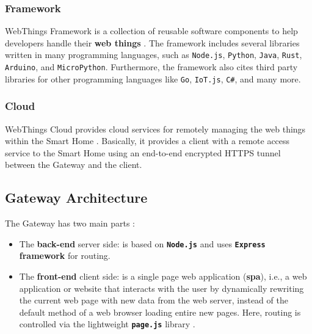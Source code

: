 \subsubsection{Framework}
WebThings Framework is a collection of reusable software components to help developers handle their \textbf{\glspl{web thing}} \cite{wtframework}. The framework includes several libraries written in many programming languages, such as \texttt{Node.js}, \texttt{Python}, \texttt{Java}, \texttt{Rust}, \texttt{Arduino}, and \texttt{MicroPython}. Furthermore, the framework also cites third party libraries for other programming languages like \texttt{Go}, \texttt{IoT.js}, \texttt{C\#}, and many more.

\subsubsection{Cloud}
WebThings Cloud provides cloud services for remotely managing the \glspl{web thing} within the Smart Home \cite{wtabout}. Basically, it provides a client with a remote access service to the Smart Home using an end-to-end encrypted 
HTTPS  %
tunnel between the Gateway and the client.



\subsection{Gateway Architecture}

The Gateway has two main parts \cite{gatewayarch}: 
\begin{itemize}
    \item The \textbf{back-end} server side: is based on \texttt{\textbf{Node.js}} \cite{nodejshome} and uses \textbf{\texttt{Express} framework} \cite{expressjshome} for routing.
    
    \item The \textbf{front-end} client side: is a single page web application (\textbf{\gls{spa}}), i.e., a web application or website that interacts with the user by dynamically rewriting the current web page with new data from the web server, instead of the default method of a web browser loading entire new pages. Here, routing is controlled via the lightweight  \texttt{\textbf{page.js}} library \cite{pagejsgithub}.
\end{itemize}



